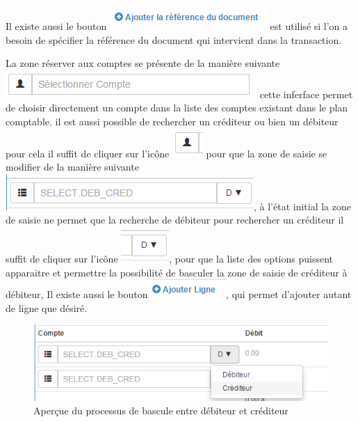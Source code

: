 \documentclass[12pt,a4paper]{report}
\begin{document}
Il existe aussi le bouton \includegraphics[scale=0.7]{pic/AddRefDoc.png} est utilisé si l'on a besoin de spécifier la référence du document qui intervient dans la transaction. 

La zone réserver aux comptes se présente de la manière suivante
\\
\includegraphics[scale=0.7]{pic/SelectCompte.png} cette inferface permet de choisir directement un compte dans la liste des comptes existant dans le plan comptable. il est aussi possible de rechercher un créditeur ou bien un débiteur pour cela il suffit de cliquer sur l'icône \includegraphics[scale=0.7]{pic/SelectCompteIcone.png} pour que la zone de saisie se modifier de la manière suivante \includegraphics[scale=0.7]{pic/SelectDebCred.png}, à l'état initial la zone de saisie ne permet que la recherche de débiteur pour rechercher un créditeur il suffit de cliquer sur l'icône \includegraphics[scale=0.7]{pic/DebToCred.png}, pour que la liste des options puissent apparaitre et permettre la possibilité de basculer la zone de saisie de créditeur à débiteur, Il existe aussi le bouton \includegraphics[scale=0.7]{pic/AjouterLigne.png}, qui permet d'ajouter autant de ligne que désiré.

\begin{figure}[h]
\begin{center}
\includegraphics[width=12cm]{pic/SelectCredit.png}
\end{center}
\caption{Aperçue du processus de bascule entre débiteur et créditeur}
\label{Aperçue du processus de bascule entre débiteur et créditeur}
\end{figure}
\end{document}

